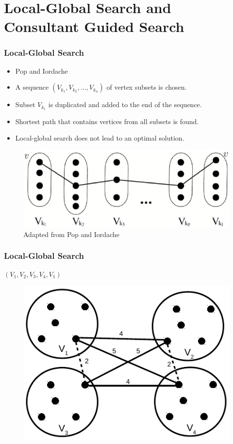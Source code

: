 \documentclass{beamer}
\begin{document}
\section[Local-Global Search and Consultant Guided Search]{Local-Global Search and Consultant Guided Search}
\begin{frame}
	\frametitle{Local-Global Search}
\begin{itemize}
	\item Pop and Iordache
	\item A sequence $(V_{k_{1}}, V_{k_{2}}, ..., V_{k_{n}})$ of vertex subsets is chosen.
	\item Subset $V_{k_{1}}$ is duplicated and added to the end of the sequence.
	\item Shortest path that contains vertices from all subsets is found. 
	\item Local-global search does not lead to an optimal solution. 
\end{itemize}
\begin{figure}
	\centering
	\includegraphics[scale=0.9]{LocalGlobalExampleRevised.pdf}
	\caption{Adapted from Pop and Iordache}
\end{figure}

\end{frame}

\begin{frame}
\frametitle{Local-Global Search}
\begin{center}
$(V_{1},V_{2},V_{3},V_{4},V_{1})$
\end{center}
\begin{figure}
	\centering
	\includegraphics{localglobal2revised.pdf}
\end{figure}

\end{frame}
\end{document}
